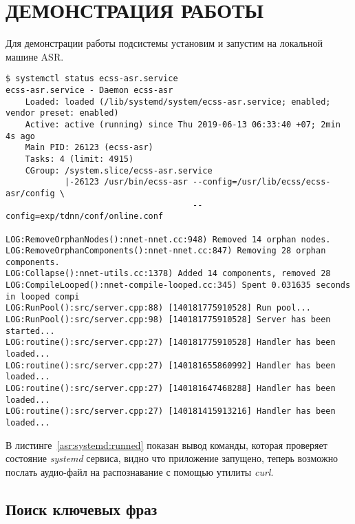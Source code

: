 \chapter{ДЕМОНСТРАЦИЯ РАБОТЫ}

Для демонстрации работы подсистемы установим и запустим на локальной машине ASR.
\begin{lstlisting}[caption={Проверка systemd сервиса},label=asr:systemd:runned]
$ systemctl status ecss-asr.service
ecss-asr.service - Daemon ecss-asr
    Loaded: loaded (/lib/systemd/system/ecss-asr.service; enabled; vendor preset: enabled)
    Active: active (running) since Thu 2019-06-13 06:33:40 +07; 2min 4s ago
    Main PID: 26123 (ecss-asr)
    Tasks: 4 (limit: 4915)
    CGroup: /system.slice/ecss-asr.service
            |-26123 /usr/bin/ecss-asr --config=/usr/lib/ecss/ecss-asr/config \
                                      --config=exp/tdnn/conf/online.conf

LOG:RemoveOrphanNodes():nnet-nnet.cc:948) Removed 14 orphan nodes.
LOG:RemoveOrphanComponents():nnet-nnet.cc:847) Removing 28 orphan components.
LOG:Collapse():nnet-utils.cc:1378) Added 14 components, removed 28
LOG:CompileLooped():nnet-compile-looped.cc:345) Spent 0.031635 seconds in looped compi
LOG:RunPool():src/server.cpp:88) [140181775910528] Run pool...
LOG:RunPool():src/server.cpp:98) [140181775910528] Server has been started...
LOG:routine():src/server.cpp:27) [140181775910528] Handler has been loaded...
LOG:routine():src/server.cpp:27) [140181655860992] Handler has been loaded...
LOG:routine():src/server.cpp:27) [140181647468288] Handler has been loaded...
LOG:routine():src/server.cpp:27) [140181415913216] Handler has been loaded...

\end{lstlisting}

В листинге~\ref{asr:systemd:runned} показан вывод команды, которая проверяет
состояние \textit{systemd} сервиса, видно что приложение запущено, теперь возможно
послать аудио-файл на распознавание с помощью утилиты \textit{curl}.

\section{Поиск ключевых фраз}

